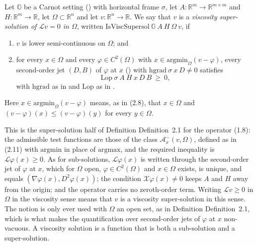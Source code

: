 \begin{definition}
Let $\mathbb G$ be a Carnot setting () with horizontal frame
$\sigma$, let $A:\mathbb R^m\to\mathbb R^{m\times m}$ and $H:\mathbb R^m\to\mathbb R$, let
$\Omega\subset\mathbb R^n$ and let $v:\mathbb R^n\to\mathbb R$. We say that $v$ is a
\emph{viscosity super-solution of $\mathcal Lv=0$ in $\Omega$}, written
$\mathrm{IsViscSupersol}\ \mathbb G\ A\ H\ \Omega\ v$, if
\begin{enumerate}
\item $v$ is lower semi-continuous on $\Omega$; and
\item for every $x\in\Omega$ and every $\varphi\in C^{2}(\Omega)$ with
  $x\in\mathrm{argmin}_\Omega(v-\varphi)$, every second-order jet $(D,B)$ of $\varphi$ at
  $x$ () with $\mathrm{hgrad}\ \sigma\ x\ D\neq0$ satisfies
  \[
   \mathrm{Lop}\ \sigma\ A\ H\ x\ D\ B\ \ge\ 0 ,
  \]
  with $\mathrm{hgrad}$ as in  and $\mathrm{Lop}$ as in .
\end{enumerate}
Here $x\in\mathrm{argmin}_\Omega(v-\varphi)$ means, as in (2.8), that $x\in\Omega$
and $(v-\varphi)(x)\le(v-\varphi)(y)$ for every $y\in\Omega$.

This is the super-solution half of Definition Definition~2.1 for the operator (1.8): the
admissible test functions are those of the class $\mathcal A^{-}_x(v,\Omega)$, defined as
in (2.11) with $\mathrm{argmin}$ in place of $\mathrm{argmax}$, and the required
inequality is $\mathcal L\varphi(x)\ge0$. As for sub-solutions, $\mathcal L\varphi(x)$ is
written through the second-order jet of $\varphi$ at $x$, which for $\Omega$ open,
$\varphi\in C^{2}(\Omega)$ and $x\in\Omega$ exists, is unique, and equals
$(\nabla\varphi(x),D^2\varphi(x))$;
the condition $\mathcal X\varphi(x)\neq0$ keeps $A$ and $H$ away from the origin; and the
operator carries no zeroth-order term. Writing $\mathcal Lv\ge0$ in $\Omega$ in the
viscosity sense means that $v$ is a viscosity super-solution in this sense. The notion is only ever used with $\Omega$ an open set, as in
Definition Definition~2.1, which is what makes the quantification over second-order jets of
$\varphi$ at $x$ non-vacuous. A viscosity solution is a function that is both a
sub-solution and a super-solution.
\end{definition}
